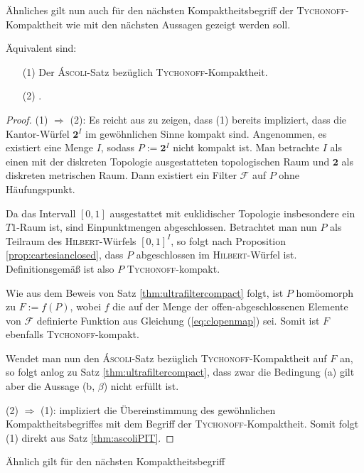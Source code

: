 Ähnliches gilt nun auch für den nächsten Kompaktheitsbegriff der \textsc{Tychonoff}-Kompaktheit wie mit den nächsten Aussagen gezeigt werden soll.

\begin{thm}
  Äquivalent sind:
  \begin{enumerate}
    \item[(1)] Der \textsc{Áscoli}-Satz bezüglich \textsc{\textsc{Tychonoff}}-Kompaktheit.
    \item[(2)] \PIT.
  \end{enumerate}
\end{thm}

\begin{proof}
  (1) $\Rightarrow$ (2): Es reicht aus zu zeigen, dass (1) bereits impliziert, dass die Kantor-Würfel $\mathbf{2}^I$ im gewöhnlichen Sinne kompakt sind.
  Angenommen, es existiert eine Menge $I$, sodass $P:= \mathbf{2}^I$ nicht kompakt ist.
  Man betrachte $I$ als einen mit der diskreten Topologie ausgestatteten topologischen Raum und $\mathbf{2}$ als diskreten metrischen Raum.
  Dann existiert ein Filter $\mathcal{F}$ auf $P$ ohne Häufungspunkt.

  Da das Intervall $[0,1]$ ausgestattet mit euklidischer Topologie insbesondere ein $T1$-Raum ist, sind Einpunktmengen abgeschlossen.
  Betrachtet man nun $P$ als Teilraum des \textsc{Hilbert}-Würfels $[0,1]^I$, so folgt nach Proposition \ref{prop:cartesianclosed}, dass $P$ abgeschlossen im \textsc{Hilbert}-Würfel ist.
  Definitionsgemäß ist also $P$ \textsc{Tychonoff}-kompakt.

  Wie aus dem Beweis von Satz \ref{thm:ultrafiltercompact} folgt, ist $P$ homöomorph zu $F:= f(P)$, wobei $f$ die auf der Menge der offen-abgeschlossenen Elemente von $\mathcal{F}$ definierte Funktion aus Gleichung (\ref{eq:clopenmap}) sei.
  Somit ist $F$ ebenfalls \textsc{Tychonoff}-kompakt.

  Wendet man nun den \textsc{Áscoli}-Satz bezüglich \textsc{Tychonoff}-Kompaktheit auf $F$ an, so folgt anlog zu Satz \ref{thm:ultrafiltercompact}, dass zwar die Bedingung (a) gilt aber die Aussage (b, $\beta$) nicht erfüllt ist.

  (2) $\Rightarrow$ (1): \PIT impliziert die Übereinstimmung des gewöhnlichen Kompaktheitsbegriffes mit dem Begriff der \textsc{Tychonoff}-Kompaktheit. Somit folgt (1) direkt aus Satz \ref{thm:ascoliPIT}.
\end{proof}

Ähnlich gilt für den nächsten Kompaktheitsbegriff

